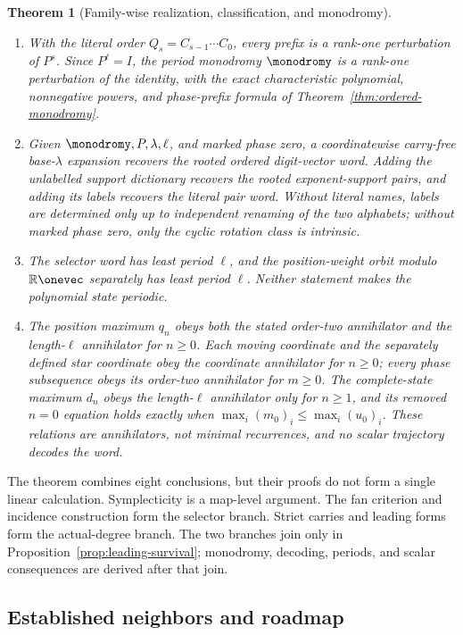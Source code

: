 \documentclass[11pt,letterpaper]{article}
\newtheorem{theoremA}{Theorem}
\theoremstyle{definition}
\theoremstyle{remark}
\numberwithin{equation}{section}
\begin{document}
\begin{theoremA}[Family-wise realization, classification, and monodromy]
\begin{enumerate}[label=\textup{(\arabic*)},leftmargin=2.8em]
\item With the literal order \(Q_s=C_{s-1}\cdots C_0\), every prefix is a
rank-one perturbation of \(P^s\).  Since \(P^\ell=I\), the period monodromy
\(\monodromy\) is a rank-one perturbation of the identity, with the exact
characteristic polynomial, nonnegative powers, and phase-prefix formula of
Theorem~\ref{thm:ordered-monodromy}.

\item Given \(\monodromy,P,\lambda,\ell\), and marked phase zero, a
coordinatewise carry-free base-\(\lambda\) expansion recovers the rooted
ordered digit-vector word.  Adding the unlabelled support dictionary recovers
the rooted exponent-support pairs, and adding its labels recovers the literal
pair word.  Without literal names, labels are determined only up to
independent renaming of the two alphabets; without marked phase zero, only
the cyclic rotation class is intrinsic.

\item The selector word has least period \(\ell\), and the position-weight
orbit modulo \(\mathbb R\onevec\) separately has least period \(\ell\).
Neither statement makes the polynomial state periodic.

\item The position maximum \(q_n\) obeys both the stated order-two
annihilator and the length-\(\ell\) annihilator for \(n\geq0\).  Each
moving coordinate and the separately defined star coordinate obey the
coordinate annihilator for \(n\geq0\); every phase subsequence obeys its
order-two annihilator for \(m\geq0\).  The complete-state maximum \(d_n\)
obeys the length-\(\ell\) annihilator only for \(n\geq1\), and its removed
\(n=0\) equation holds exactly when \(\max_i(m_0)_i\leq\max_i(u_0)_i\).
These relations are annihilators, not minimal recurrences, and no scalar
trajectory decodes the word.
\end{enumerate}
\end{theoremA}

The theorem combines eight conclusions, but their proofs do not form a
single linear calculation.  Symplecticity is a map-level argument.  The fan
criterion and incidence construction form the selector branch.  Strict
carries and leading forms form the actual-degree branch.  The two branches
join only in Proposition~\ref{prop:leading-survival}; monodromy, decoding,
periods, and scalar consequences are derived after that join.

\subsection{Established neighbors and roadmap}
\end{document}
